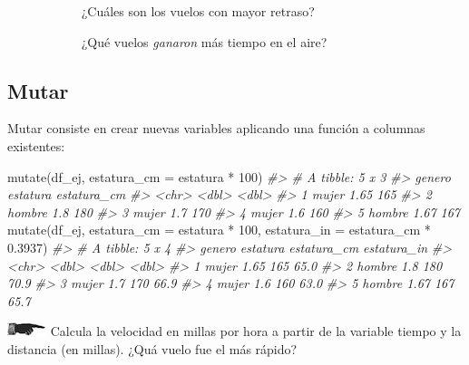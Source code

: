\documentclass[
]{book}
\newenvironment{Shaded}{\begin{snugshade}}{\end{snugshade}}
\newcommand{\AttributeTok}[1]{\textcolor[rgb]{0.77,0.63,0.00}{#1}}
\newcommand{\CommentTok}[1]{\textcolor[rgb]{0.56,0.35,0.01}{\textit{#1}}}
\newcommand{\DecValTok}[1]{\textcolor[rgb]{0.00,0.00,0.81}{#1}}
\newcommand{\FloatTok}[1]{\textcolor[rgb]{0.00,0.00,0.81}{#1}}
\newcommand{\FunctionTok}[1]{\textcolor[rgb]{0.00,0.00,0.00}{#1}}
\newcommand{\NormalTok}[1]{#1}
\newcommand{\SpecialCharTok}[1]{\textcolor[rgb]{0.00,0.00,0.00}{#1}}
\begin{document}
~~~~~~~~~~~ ¿Cuáles
son los vuelos con mayor retraso?

~~~~~~~~~~~ ¿Qué vuelos
\emph{ganaron} más tiempo en el aire?

\hypertarget{mutar}{%
\subsection*{Mutar}\label{mutar}}

Mutar consiste en crear nuevas variables aplicando una función a columnas
existentes:

\begin{Shaded}
\begin{Highlighting}[]
\FunctionTok{mutate}\NormalTok{(df\_ej, }\AttributeTok{estatura\_cm =}\NormalTok{ estatura }\SpecialCharTok{*} \DecValTok{100}\NormalTok{) }
\CommentTok{\#\textgreater{} \# A tibble: 5 x 3}
\CommentTok{\#\textgreater{}   genero estatura estatura\_cm}
\CommentTok{\#\textgreater{}   \textless{}chr\textgreater{}     \textless{}dbl\textgreater{}       \textless{}dbl\textgreater{}}
\CommentTok{\#\textgreater{} 1 mujer      1.65         165}
\CommentTok{\#\textgreater{} 2 hombre     1.8          180}
\CommentTok{\#\textgreater{} 3 mujer      1.7          170}
\CommentTok{\#\textgreater{} 4 mujer      1.6          160}
\CommentTok{\#\textgreater{} 5 hombre     1.67         167}
\FunctionTok{mutate}\NormalTok{(df\_ej, }\AttributeTok{estatura\_cm =}\NormalTok{ estatura }\SpecialCharTok{*} \DecValTok{100}\NormalTok{, }\AttributeTok{estatura\_in =}\NormalTok{ estatura\_cm }\SpecialCharTok{*} \FloatTok{0.3937}\NormalTok{) }
\CommentTok{\#\textgreater{} \# A tibble: 5 x 4}
\CommentTok{\#\textgreater{}   genero estatura estatura\_cm estatura\_in}
\CommentTok{\#\textgreater{}   \textless{}chr\textgreater{}     \textless{}dbl\textgreater{}       \textless{}dbl\textgreater{}       \textless{}dbl\textgreater{}}
\CommentTok{\#\textgreater{} 1 mujer      1.65         165        65.0}
\CommentTok{\#\textgreater{} 2 hombre     1.8          180        70.9}
\CommentTok{\#\textgreater{} 3 mujer      1.7          170        66.9}
\CommentTok{\#\textgreater{} 4 mujer      1.6          160        63.0}
\CommentTok{\#\textgreater{} 5 hombre     1.67         167        65.7}
\end{Highlighting}
\end{Shaded}

\includegraphics{imagenes/manicule2.jpg} Calcula la velocidad en millas por hora a partir de
la variable tiempo y la distancia (en millas). ¿Quá vuelo fue el más rápido?
\end{document}
